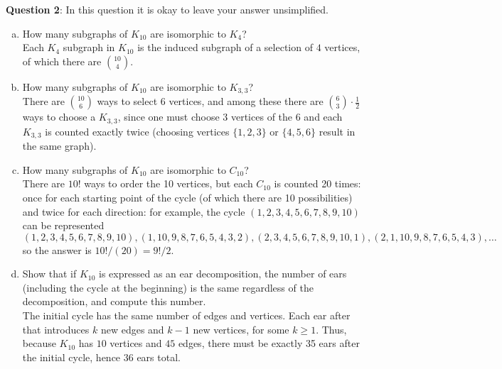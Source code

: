 \documentclass{amsart}
\begin{document}
	\newpage 
	
	\noindent \textbf{Question 2}: In this question it is okay to leave your answer unsimplified.
	\begin{enumerate}[(a)]
		\item How many subgraphs of $K_{10}$ are isomorphic to $K_4$? \\
		
		Each $K_4$ subgraph in $K_{10}$ is the induced subgraph of a selection of $4$ vertices, of which there are ${10 \choose 4}$.
		\vspace{70px}
		
		\item How many subgraphs of $K_{10}$ are isomorphic to $K_{3,3}$?\\
		
		\noindent There are ${10\choose 6}$ ways to select 6 vertices, and among these there are ${6\choose 3}\cdot \tfrac12$ ways to choose a $K_{3,3}$, since one must choose $3$ vertices of the 6 and each $K_{3,3}$ is counted exactly twice (choosing vertices $\{1,2,3\}$ or $\{4,5,6\}$ result in the same graph). \\
		
		\vspace{50px}
		
		\item How many subgraphs of $K_{10}$ are isomorphic to $C_{10}$?\\
		
		\noindent There are $10!$ ways to order the 10 vertices, but each $C_{10}$ is counted 20 times: once for each starting point of the cycle (of which there are 10 possibilities) and twice for each direction: for example, the cycle $(1,2,3,4,5,6,7,8,9,10)$ can be represented
		$$
		(1,2,3,4,5,6,7,8,9,10), (1,10,9,8,7,6,5,4,3,2), (2,3,4,5,6,7,8,9,10,1), (2,1,10,9,8,7,6,5,4,3), \dots 
		$$
		so the answer is $10!/(20) = 9!/2$.
		
		\vspace{50px}
		
		\item Show that if $K_{10}$ is expressed as an ear decomposition, the number of ears (including the cycle at the beginning) is the same regardless of the decomposition, and compute this number. \\
		
		The initial cycle has the same number of edges and vertices. Each ear after that introduces $k$ new edges and $k-1$ new vertices, for some $k\geq 1$. Thus, because $K_{10}$ has $10$ vertices and $45$ edges, there must be exactly 35 ears after the initial cycle, hence $36$ ears total.
	\end{enumerate}
	
\end{document}
